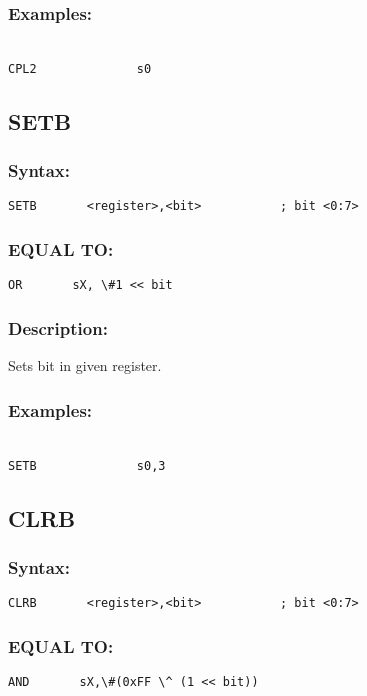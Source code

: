         \subsubsection{Examples:}
        {
            ~\\
            \usecodefont
            \verb'CPL2              s0'\\
        }

    \subsection{SETB}
        \subsubsection{Syntax:}
            \verb'SETB       <register>,<bit>           ; bit <0:7>'

        \subsubsection{EQUAL TO:}
            \verb'OR       sX, \#1 << bit'

        \subsubsection{Description:}
            Sets bit in given register.

        \subsubsection{Examples:}
        {
            ~\\
            \usecodefont
            \verb'SETB              s0,3'\\
        }

    \subsection{CLRB}
        \subsubsection{Syntax:}
            \verb'CLRB       <register>,<bit>           ; bit <0:7>'

        \subsubsection{EQUAL TO:}
            \verb'AND       sX,\#(0xFF \^ (1 << bit))'

